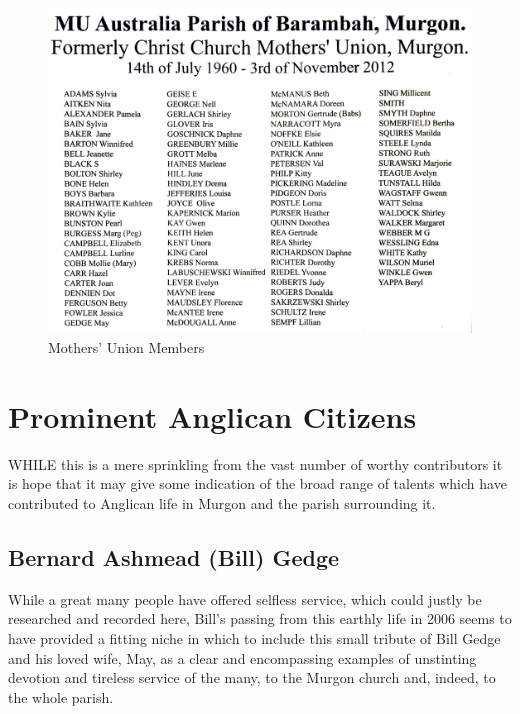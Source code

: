 \begin{figure}[!htb]
\begin{center}
\includegraphics[width=1.\textwidth,center]{../images/MothersUnionNames.jpg}
\caption{Mothers' Union Members}
\end{center}
\end{figure}


\balance


\printendnotes[custom]
\setcounter{endnote}{0}
\chapter{Prominent Anglican Citizens}
\nobalance


\lettrine[lines=3]{W}{HILE}
 this is a mere sprinkling from the vast number of worthy contributors it is hope that it may give some indication of the broad range of talents which have contributed to Anglican life in Murgon and the parish surrounding it.

\section{Bernard Ashmead (Bill) Gedge}



While a great many people have offered selfless service, which could justly be researched and recorded here, Bill's passing from this earthly life in 2006 seems to have provided a fitting niche in which to include this small tribute of Bill Gedge and his loved wife, May, as a clear and encompassing examples of unstinting devotion and tireless service of the many, to the Murgon church and, indeed, to the whole parish.









